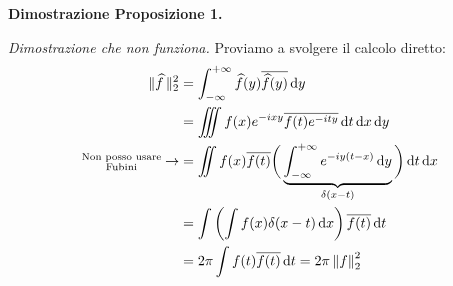 




\vss

\textbf{Dimostrazione Proposizione 1.}

\textit{Dimostrazione che non funziona.} Proviamo a svolgere il calcolo diretto:
$$
\begin{aligned}
	\|\widehat f\,\|_2^2 
	& = \int_{-\infty}^{+\infty} \widehat f(y) \overline{\widehat f(y)} \,\mathrm{d} y \\
	& = \iiint f(x) e^{-ixy} \overline{f(t) e^{-ity}} \,\mathrm{d} t \,\mathrm{d} x \,\mathrm{d} y \\
	\substack{\text{Non posso usare} \\ \text{Fubini}} \to & = \iint f(x) \overline{f(t)} \bigg( \underbrace{\int_{-\infty}^{+\infty} e^{-iy(t-x)} \,\mathrm{d} y}_{\delta(x-t)} \bigg) \,\mathrm{d} t \,\mathrm{d} x \\
	& = \int \left( \int f(x) \delta(x - t) \,\mathrm{d} x \right) \overline{f(t)} \,\mathrm{d} t \\
	& = 2\pi \int f(t) \overline{f(t)} \,\mathrm{d} t = 2\pi \left\lVert f \right\rVert_2^2
\end{aligned}
$$

